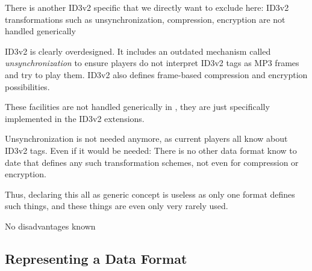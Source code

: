 There is another ID3v2 specific that we directly want to exclude here:
{%
ID3v2 transformations such as unsynchronization, compression, encryption are not handled generically
}
{%
ID3v2 is clearly overdesigned. It includes an outdated mechanism called \emph{unsynchronization} to ensure players do not interpret ID3v2 tags as MP3 frames and try to play them. ID3v2 also defines frame-based compression and encryption possibilities.

These facilities are not handled generically in \LibName{}, they are just specifically implemented in the ID3v2 extensions.
}
{%
Unsynchronization is not needed anymore, as current players all know about ID3v2 tags. Even if it would be needed: There is no other data format know to date that defines any such transformation schemes, not even for compression or encryption.

Thus, declaring this all as generic concept is useless as only one format defines such things, and these things are even only very rarely used.
}
{%
No disadvantages known
}

\subsection{Representing a Data Format}%
\label{sec:RepresentingaDataFormat}%

